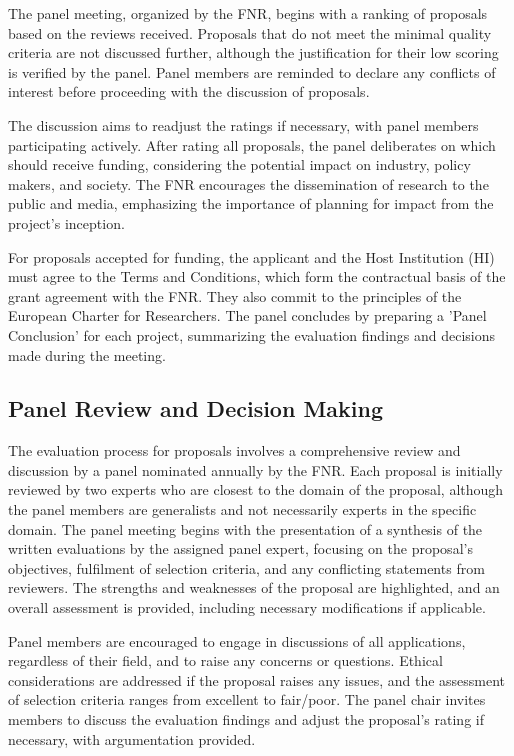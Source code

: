 \documentclass{article}
\begin{document}
The panel meeting, organized by the FNR, begins with a ranking of proposals based on the reviews received. Proposals that do not meet the minimal quality criteria are not discussed further, although the justification for their low scoring is verified by the panel. Panel members are reminded to declare any conflicts of interest before proceeding with the discussion of proposals.

The discussion aims to readjust the ratings if necessary, with panel members participating actively. After rating all proposals, the panel deliberates on which should receive funding, considering the potential impact on industry, policy makers, and society. The FNR encourages the dissemination of research to the public and media, emphasizing the importance of planning for impact from the project's inception.

For proposals accepted for funding, the applicant and the Host Institution (HI) must agree to the Terms and Conditions, which form the contractual basis of the grant agreement with the FNR. They also commit to the principles of the European Charter for Researchers. The panel concludes by preparing a 'Panel Conclusion' for each project, summarizing the evaluation findings and decisions made during the meeting.

\subsection{Panel Review and Decision Making}

The evaluation process for proposals involves a comprehensive review and discussion by a panel nominated annually by the FNR. Each proposal is initially reviewed by two experts who are closest to the domain of the proposal, although the panel members are generalists and not necessarily experts in the specific domain. The panel meeting begins with the presentation of a synthesis of the written evaluations by the assigned panel expert, focusing on the proposal's objectives, fulfilment of selection criteria, and any conflicting statements from reviewers. The strengths and weaknesses of the proposal are highlighted, and an overall assessment is provided, including necessary modifications if applicable.

Panel members are encouraged to engage in discussions of all applications, regardless of their field, and to raise any concerns or questions. Ethical considerations are addressed if the proposal raises any issues, and the assessment of selection criteria ranges from excellent to fair/poor. The panel chair invites members to discuss the evaluation findings and adjust the proposal's rating if necessary, with argumentation provided.
\end{document}
